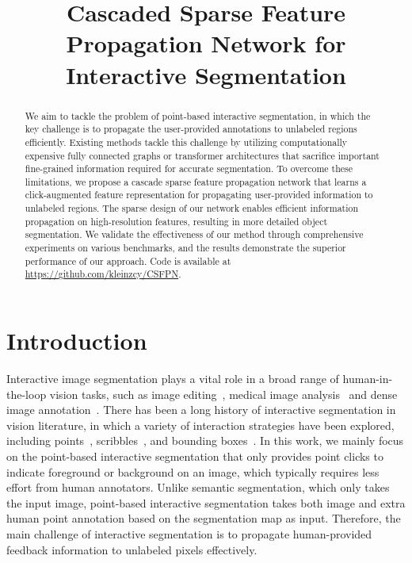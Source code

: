 \documentclass{bmvc2k}
\title{Cascaded Sparse Feature Propagation Network for Interactive Segmentation}
\begin{document}
\maketitle
\def\thefootnote{*}
\begin{abstract}
We aim to tackle the problem of point-based interactive segmentation, in which the key challenge is to propagate the user-provided annotations to unlabeled regions efficiently. Existing methods tackle this challenge by utilizing computationally expensive fully connected graphs or transformer architectures that sacrifice important fine-grained information required for accurate segmentation. To overcome these limitations, we propose a cascade sparse feature propagation network that learns a click-augmented feature representation for propagating user-provided information to unlabeled regions. The sparse design of our network enables efficient information propagation on high-resolution features, resulting in more detailed object segmentation. We validate the effectiveness of our method through comprehensive experiments on various benchmarks, and the results demonstrate the superior performance of our approach. Code is available at \href{https://github.com/kleinzcy/CSFPN}{https://github.com/kleinzcy/CSFPN}.
\end{abstract}


%
 
\section{Introduction}
Interactive image segmentation plays a vital role in a broad range of human-in-the-loop vision tasks, such as image editing~\cite{cheng2010repfinder}, medical image analysis~\cite{wang2018deepigeos} and dense image annotation~\cite{sofiiuk2020f}. There has been a long history of interactive segmentation in vision literature, in which a variety of interaction strategies have been explored, including points~\cite{xu2016deep,sofiiuk2020f}, scribbles~\cite{bai2014error,agustsson2019interactive}, and bounding boxes~\cite{rother2004grabcut}. In this work, we mainly focus on the point-based interactive segmentation that only provides point clicks to indicate foreground or background on an image, which typically requires less effort from human annotators.  
Unlike semantic segmentation, which only takes the input image, point-based interactive segmentation takes both image and extra human point annotation based on the segmentation map as input. Therefore, the main challenge of interactive segmentation is to propagate human-provided feedback information to unlabeled pixels effectively.
\end{document}
